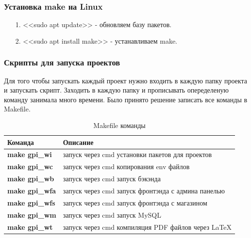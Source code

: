 
\subsubsection*{Установка make на Linux}

\begin{itemize}
    \item[1.] <<sudo apt update>> - обновляем базу пакетов.
    \item[2.] <<sudo apt install make>> - устанавливаем make.
\end{itemize}

\newpage


\subsubsection*{Скрипты для запуска проектов}

Для того чтобы запускать каждый проект нужно входить в каждую папку проекта и запускать скрипт.
Заходить в каждую папку и прописывать опеределеную команду занимала много времени.
Было принято решение записать все команды в Makefile.

\begin{table}[!h]
    \centering
    \caption{Makefile команды}
    \begin{tabular}{|l|l|}
        \hline
        \textbf{Команда}        & \textbf{Описание}                                     \\ \hline
        \textbf{make gpi\_wi}   & запуск через cmd установки пакетов для проектов       \\ \hline 
        \textbf{make gpi\_wc}   & запуск через cmd копирования env файлов               \\ \hline  
        \textbf{make gpi\_wb}   & запуск через cmd запуск бэкэнда                       \\ \hline
        \textbf{make gpi\_wfa}  & запуск через cmd запуск фронтэнда с админа панелью    \\ \hline
        \textbf{make gpi\_wfs}  & запуск через cmd запуск фронтэнда с магазином         \\ \hline
        \textbf{make gpi\_wm}   & запуск через cmd запуск MySQL                         \\ \hline
        \textbf{make gpi\_wt}   & запуск через cmd компиляция PDF файлов через LaTeX    \\ \hline
    \end{tabular}
\end{table}

